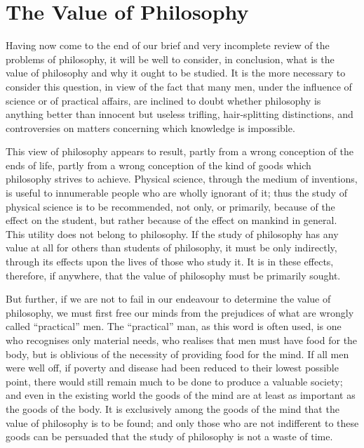 
\author{Bertrand Russell}
\chapter[Bertrand Russell -- The Value of Philosophy]{The Value of
Philosophy}


Having now come to the end of our brief and very incomplete
review of the problems of philosophy, it will be well to consider, in
conclusion, what is the value of philosophy and why it ought to be
studied. It is the more necessary to consider this question, in view
of the fact that many men, under the influence of science or of
practical affairs, are inclined to doubt whether philosophy is
anything better than innocent but useless trifling, hair-splitting
distinctions, and controversies on matters concerning which knowledge
is impossible.

This view of philosophy appears to result, partly from a wrong
conception of the ends of life, partly from a wrong conception of the
kind of goods which philosophy strives to  achieve. Physical
science, through the medium of inventions, is useful to innumerable
people who are wholly ignorant of it; thus the study of physical
science is to be recommended, not only, or primarily, because of the
effect on the student, but rather because of the effect on mankind in
general. This utility does not belong to philosophy. If the study of
philosophy has any value at all for others than students of
philosophy, it must be only indirectly, through its effects upon the
lives of those who study it. It is in these effects, therefore, if
anywhere, that the value of philosophy must be primarily sought.

But further, if we are not to fail in our endeavour to determine the
value of philosophy, we must first free our minds from the prejudices
of what are wrongly called ``practical'' men. The ``practical'' man,
as this word is often used, is one who recognises only material needs,
who realises that men must have food for the body, but is oblivious of
the necessity of providing food for the mind. If all men were well
off, if poverty and disease had been reduced to their lowest possible
point, there  would still remain much to be done to produce
a valuable society; and even in the existing world the goods of the
mind are at least as important as the goods of the body. It is
exclusively among the goods of the mind that the value of philosophy
is to be found; and only those who are not indifferent to these goods
can be persuaded that the study of philosophy is not a waste of time.


